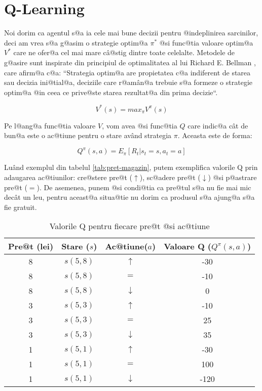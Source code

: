 \section{Q-Learning}

Noi dorim ca agentul s@a ia cele mai bune decizii pentru @indeplinirea sarcinilor, deci am vrea s@a g@asim o strategie optim@a $\pi^*$ @si func@tia valoare optim@a $V^{*}$ care ne ofer@a cel mai mare c\^ a@stig dintre toate celelalte. Metodele de g@asire sunt inspirate din principiul de optimalitatea al lui Richard E. Bellman \cite{bellman-theory}, care afirm@a c@a: ``Strategia optim@a are propietatea c@a indiferent de starea sau decizia ini@tial@a, deciziile care r@am\^ an@a trebuie s@a formeze o strategie optim@a @in ceea ce prive@ste starea rezultat@a din prima decizie``.  

\begin{equation}
	V^{*}(s) = max_{\pi} V^{\pi}(s)
\end{equation}

Pe l@ang@a func@tia valoare $V$, vom avea @si func@tia $Q$ care indic@a c\^ at de bun@a este o ac@tiune pentru o stare av\^and strategia $\pi$. Aceasta este de forma:

\begin{equation}
	Q^{\pi}(s, a) = E_{\pi} \left[ R_t | s_t = s, a_t = a \right]
\end{equation}

Lu\^and exemplul din tabelul \ref{tab:pret-magazin}, putem exemplifica valorile Q prin adaugarea ac@tiunilor: cre@stere pre@t ($\uparrow$), sc@adere pre@t ($\downarrow$) @si p@astrare pre@t ($=$). De asemenea, punem @si condi@tia ca pre@tul s@a nu fie mai mic dec\^at un leu, pentru aceast@a situa@tie nu dorim ca produsul s@a ajung@a s@a fie gratuit.

\begin{table}[h]
	\begin{center}
		\begin{tabular}{|c|c|c|c|}
			\hline
			Pre@t (lei) & Stare ($s$) & Ac@tiune($a$) & Valoare Q ($Q^{\pi}(s, a)$) \\
			\hline
			8 & $s(5,8)$ & $\uparrow$ & -30 \\ 
			\hline
			8 & $s(5,8)$ & $=$ & -10 \\
			\hline
			8 & $s(5,8)$ & $\downarrow$ & 0 \\
			\hline
			3 & $s(5,3)$ & $\uparrow$ & -10 \\ 
			\hline
			3 & $s(5,3)$ & $=$ & 25 \\
			\hline
			3 & $s(5,3)$ & $\downarrow$ & 35 \\
			\hline
			1 & $s(5,1)$ & $\uparrow$ & -30 \\ 
			\hline
			1 & $s(5,1)$ & $=$ & 100 \\
			\hline
			1 & $s(5,1)$ & $\downarrow$ & -120 \\
			\hline
		\end{tabular}
	\end{center}
	\caption{Valorile Q pentru fiecare pre@t @si ac@tiune}
	\label{tab:pret-magazin-q}
\end{table}

